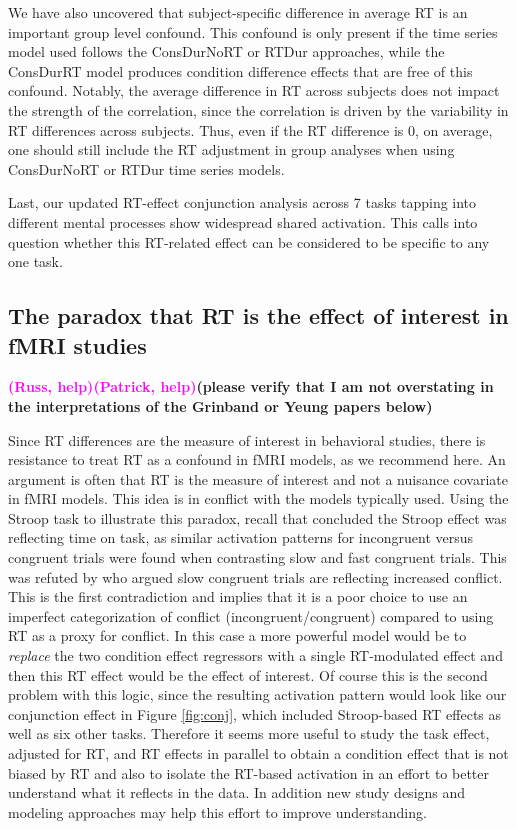 \documentclass[titlepage,12pt] {article}
\newcommand{\rh}{\textcolor{magenta}{\textbf{(Russ, help)}}}
\newcommand{\ph}{\textcolor{magenta}{\textbf{(Patrick, help)}}}
\begin{document}
We have also uncovered that subject-specific difference in average RT is an important group level confound.  This confound is only present if the time series model used follows the ConsDurNoRT or RTDur approaches, while the ConsDurRT model produces condition difference effects that are free of this confound.  Notably, the average difference in RT across subjects does not impact the strength of the correlation, since the correlation is driven by the variability in RT differences across subjects.  Thus, even if the RT difference is 0, on average, one should still include the RT adjustment in group analyses when using ConsDurNoRT or RTDur time series models.


Last, our updated RT-effect conjunction analysis across 7 tasks tapping into different mental processes show widespread shared activation. This calls into question whether this RT-related effect can be considered to be specific to any one task.


\subsection*{The paradox that RT is the effect of interest in fMRI studies}
\rh\ph \textbf{(please verify that I am not overstating in the interpretations of the Grinband or Yeung papers below)}

Since RT differences are the measure of interest in behavioral studies, there is resistance to treat RT as a confound in fMRI models, as we recommend here.  An argument is often that RT is the  measure of interest and not a nuisance covariate in fMRI models.  This idea is in conflict with the models typically used.  Using the Stroop task to illustrate this paradox, recall that \citet{grinband_dorsal_2011} concluded the Stroop effect was reflecting time on task, as similar activation patterns for incongruent versus congruent trials were found when contrasting slow and fast congruent trials.  This was refuted by \citet{yeung_errors_2011}  who argued slow congruent trials are reflecting increased conflict.  This is the first contradiction and implies that it is a poor choice to  use an imperfect categorization of conflict (incongruent/congruent) compared to using RT as a proxy for conflict.  In this case a more powerful model would be to \emph{replace} the two condition effect regressors  with a single RT-modulated effect and then this RT effect would be the effect of interest.  Of course this is the second problem with this logic, since the resulting activation pattern would look like our conjunction effect in Figure \ref{fig:conj}, which included Stroop-based RT effects as well as six other tasks.    Therefore it seems more useful to study the task effect, adjusted for RT, and RT effects in parallel to obtain a condition effect that is not biased by RT and also to isolate the RT-based activation in an effort to better understand what it reflects in the data. In addition new study designs and modeling approaches may help this effort to improve understanding.
\end{document}
